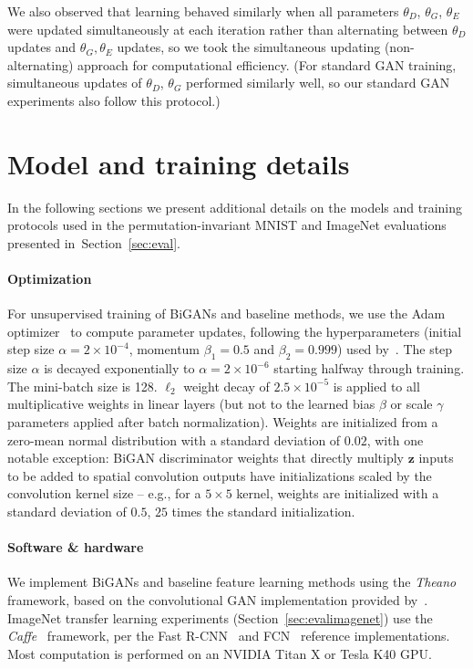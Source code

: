 \documentclass{article}
\renewcommand{\vec}[1]{\mathbf{#1}}
\newcommand{\z}{\vec{z}}
\newcommand{\refsec}[1]{Section~\ref{sec:#1}}
\begin{document}
\begin{appendices}
We also observed that learning behaved similarly when all parameters
$\theta_D$, $\theta_G$, $\theta_E$
were updated simultaneously at each iteration rather than alternating between
$\theta_D$ updates and
$\theta_G, \theta_E$ updates,
so we took the simultaneous updating (non-alternating) approach for computational efficiency.
(For standard GAN training,
simultaneous updates of $\theta_D$, $\theta_G$ performed similarly well,
so our standard GAN experiments also follow this protocol.)

\section{Model and training details}
In the following sections we present additional details on the models and training protocols used in the
permutation-invariant MNIST
and
ImageNet
evaluations presented in~\refsec{eval}.

\paragraph{Optimization}
For unsupervised training of BiGANs and baseline methods,
we use the Adam optimizer~\citep{adam} to compute parameter updates,
following the hyperparameters
(initial step size $
\alpha = 2\times10^{-4}
$, momentum $
\beta_1 = 0.5
$ and $
\beta_2 = 0.999
$)
used by~\citet{dcgan}.
The step size $\alpha$ is decayed exponentially to $
\alpha = 2\times10^{-6}
$ starting halfway through training.
The mini-batch size is 128.
$\ell_2$ weight decay of $
2.5\times10^{-5}
$
is applied to all multiplicative weights in linear layers
(but not to the learned bias $\beta$ or scale $\gamma$ parameters applied after batch normalization).
Weights are initialized from
a zero-mean normal distribution with a standard deviation of $0.02$,
with one notable exception:
BiGAN discriminator weights that directly multiply $\z$ inputs
to be added to spatial convolution outputs have initializations scaled by the convolution kernel size --
e.g., for a $5\times5$ kernel, weights are initialized with
a standard deviation of $0.5$,
$25$ times the standard initialization.

\paragraph{Software \& hardware}
We implement BiGANs and baseline feature learning methods using the \textit{Theano}~\citep{theano} framework,
based on the convolutional GAN implementation provided by~\citet{dcgan}.
ImageNet transfer learning experiments (\refsec{evalimagenet}) use the \textit{Caffe}~\citep{caffe} framework,
per the Fast R-CNN~\citep{fastrcnn} and FCN~\citep{fcn} reference implementations.
Most computation is performed on an NVIDIA Titan X or Tesla K40 GPU.


\end{appendices}
\end{document}
